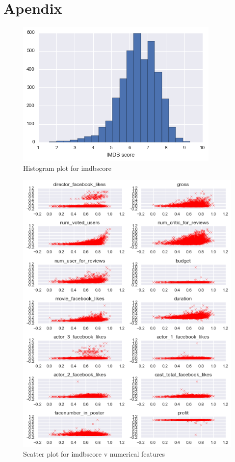 \documentclass{article}%
\begin{document}
\section{Apendix}

\begin{figure}
\centering
\includegraphics[width=1.0\columnwidth]{Fig/imdbhist.png}
\caption{Histogram plot for imdbscore}
\label{fig:imdbhist}
\end{figure}

\begin{figure}
\centering
\includegraphics[width=1.0\columnwidth]{Fig/ScatterPlot.png}
\caption{Scatter plot for imdbscore v numerical features}
\label{fig:scatter}
\end{figure}
\end{document}
